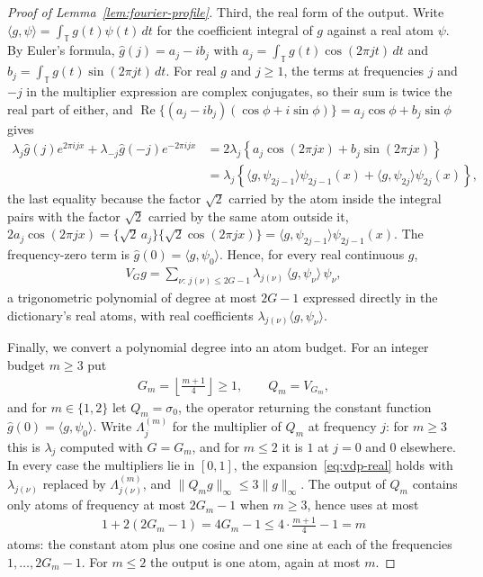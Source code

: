 \begin{proof}[Proof of Lemma~\ref{lem:fourier-profile}]
Third, the real form of the output. Write $\langle g,\psi\rangle=\int_{\mathbb T}g(t)\psi(t)\,dt$ for the coefficient integral of $g$ against a real atom $\psi$. By Euler's formula, $\hat g(j)=a_j-ib_j$ with $a_j=\int_{\mathbb T}g(t)\cos(2\pi jt)\,dt$ and $b_j=\int_{\mathbb T}g(t)\sin(2\pi jt)\,dt$. For real $g$ and $j\geq1$, the terms at frequencies $j$ and $-j$ in the multiplier expression are complex conjugates, so their sum is twice the real part of either, and $\operatorname{Re}\{(a_j-ib_j)(\cos\phi+i\sin\phi)\}=a_j\cos\phi+b_j\sin\phi$ gives
\begin{align*}
\lambda_j\hat g(j)e^{2\pi ijx}+\lambda_{-j}\hat g(-j)e^{-2\pi ijx}
&=2\lambda_j\left\{a_j\cos(2\pi jx)+b_j\sin(2\pi jx)\right\}\\
&=\lambda_j\left\{\langle g,\psi_{2j-1}\rangle\psi_{2j-1}(x)
+\langle g,\psi_{2j}\rangle\psi_{2j}(x)\right\},
\end{align*}
the last equality because the factor $\sqrt2$ carried by the atom inside the integral pairs with the factor $\sqrt2$ carried by the same atom outside it, $2a_j\cos(2\pi jx)=\{\sqrt2\,a_j\}\{\sqrt2\cos(2\pi jx)\}=\langle g,\psi_{2j-1}\rangle\psi_{2j-1}(x)$. The frequency-zero term is $\hat g(0)=\langle g,\psi_0\rangle$. Hence, for every real continuous $g$,
\begin{align}
V_Gg=\sum_{\nu:\,j(\nu)\leq2G-1}\lambda_{j(\nu)}\,\langle g,\psi_\nu\rangle\,\psi_\nu ,
\label{eq:vdp-real}
\end{align}
a trigonometric polynomial of degree at most $2G-1$ expressed directly in the dictionary's real atoms, with real coefficients $\lambda_{j(\nu)}\langle g,\psi_\nu\rangle$.

Finally, we convert a polynomial degree into an atom budget. For an integer budget $m\geq3$ put
\begin{align*}
G_m=\left\lfloor\frac{m+1}{4}\right\rfloor\geq1,
\qquad Q_m=V_{G_m},
\end{align*}
and for $m\in\{1,2\}$ let $Q_m=\sigma_0$, the operator returning the constant function $\hat g(0)=\langle g,\psi_0\rangle$. Write $\Lambda^{(m)}_j$ for the multiplier of $Q_m$ at frequency $j$: for $m\geq3$ this is $\lambda_j$ computed with $G=G_m$, and for $m\leq2$ it is $1$ at $j=0$ and $0$ elsewhere. In every case the multipliers lie in $[0,1]$, the expansion~\eqref{eq:vdp-real} holds with $\lambda_{j(\nu)}$ replaced by $\Lambda^{(m)}_{j(\nu)}$, and $\|Q_mg\|_\infty\leq3\|g\|_\infty$. The output of $Q_m$ contains only atoms of frequency at most $2G_m-1$ when $m\geq3$, hence uses at most
\begin{align}
1+2(2G_m-1)=4G_m-1\leq4\cdot\frac{m+1}4-1=m
\label{eq:atom-count}
\end{align}
atoms: the constant atom plus one cosine and one sine at each of the frequencies $1,\ldots,2G_m-1$. For $m\leq2$ the output is one atom, again at most $m$.


\end{proof}
